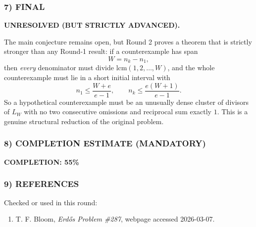 \subsubsection*{7) FINAL}
\textbf{UNRESOLVED (BUT STRICTLY ADVANCED).}

The main conjecture remains open, but Round 2 proves a theorem that is strictly stronger than any Round-1 result: if a counterexample has span
\[
W=n_k-n_1,
\]
then \emph{every} denominator must divide $\mathrm{lcm}(1,2,\dots,W)$, and the whole counterexample must lie in a short initial interval with
\[
 n_1\le \frac{W+e}{e-1},
 \qquad
 n_k\le \frac{e(W+1)}{e-1}.
\]
So a hypothetical counterexample must be an unusually dense cluster of divisors of $L_W$ with no two consecutive omissions and reciprocal sum exactly $1$. This is a genuine structural reduction of the original problem.

\subsubsection*{8) COMPLETION ESTIMATE (MANDATORY)}
\textbf{COMPLETION: 55\%}

\subsubsection*{9) REFERENCES}
Checked or used in this round:
\begin{enumerate}
\item T. F. Bloom, \emph{Erd\H{o}s Problem \#287}, webpage accessed 2026-03-07.
\end{enumerate}
